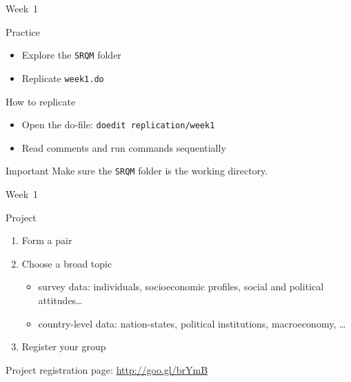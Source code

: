 \documentclass[t]{beamer}
\begin{document}
	\begin{frame}[c]{Week~1}

		\begin{exampleblock}{Practice}

			\begin{itemize}
				\item Explore the \texttt{SRQM} folder
				\item Replicate \texttt{week1.do}
			\end{itemize}
		
		\end{exampleblock}
		
		\begin{block}{How to replicate}
			
			\begin{itemize}
				\item Open the do-file: \texttt{doedit replication/week1}
				\item Read comments and run commands sequentially
			\end{itemize}

		\end{block}

		\begin{alertblock}{Important}
			Make sure the \texttt{SRQM} folder is the working directory.
		\end{alertblock}

	\end{frame}

	\begin{frame}[c]{Week~1}

		\begin{alertblock}{Project}

			\begin{enumerate}
				\item Form a pair
				\item Choose a broad topic
				\begin{itemize}
					\item survey data: individuals, socioeconomic profiles, social and political attitudes…
					\item country-level data: nation-states, political institutions, macroeconomy, …
				\end{itemize}
				\item Register your group
			\end{enumerate}

		\end{alertblock}

		\vfill
		Project registration page: \url{http://goo.gl/brYmB}
		\vfill
						
	\end{frame}
\end{document}
